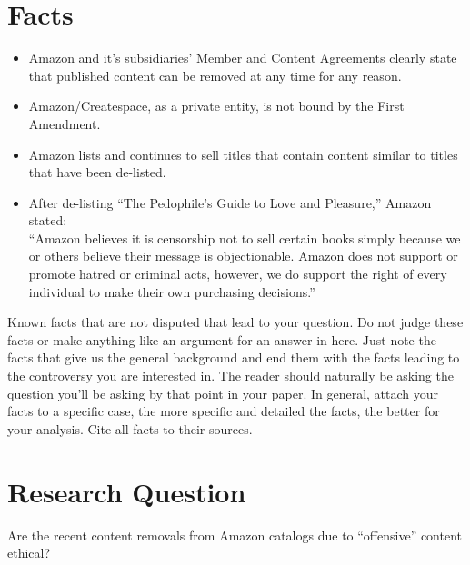 \documentclass[12pt]{article}
\begin{document}
\section{Facts}
\begin{itemize}
\item Amazon and it's subsidiaries' Member and Content Agreements clearly state that published content can be removed at any time for any reason. \cite{createspaceMemberAgreement} \cite{createspaceContentGuidelines} \cite{AmazonDTPContentGuidelines}

\item Amazon/Createspace, as a private entity, is not bound by the First Amendment.

\item Amazon lists and continues to sell titles that contain content similar to titles that have been de-listed. \cite{AmazonLolitaDTPListing}

\item After de-listing ``The Pedophile's Guide to Love and Pleasure,'' Amazon stated: \\
      ``Amazon believes it is censorship not to sell certain books simply because we or others believe their message is objectionable.  Amazon does not support or promote hatred or criminal acts, however, we do support the right of every individual to make their own purchasing decisions.'' \cite{TechCrunchAmazonCensorship}

\end{itemize}
Known facts that are not disputed that lead to your question. Do not judge these facts or make anything like an argument for an answer in here. Just note the facts that give us the general background and end them with the facts leading to the controversy you are interested in. The reader should naturally be asking the question you'll be asking by that point in your paper. In general, attach your facts to a specific case, the more specific and detailed the facts, the better for your analysis. Cite all facts to their sources. \cite{handout}

\section{Research Question}
Are the recent content removals from Amazon catalogs due to ``offensive'' content ethical?

\end{document}
